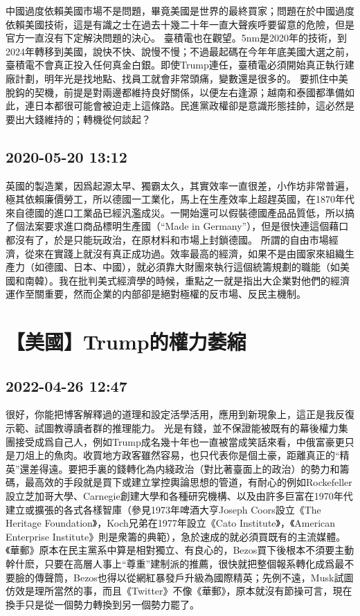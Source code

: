 \documentclass[twocolumn]{ctexart}
\begin{document}
中國過度依賴美國市場不是問題，畢竟美國是世界的最終買家；問題在於中國過度依賴美國技術，這是有識之士在過去十幾二十年一直大聲疾呼要留意的危險，但是官方一直沒有下定解決問題的決心。
臺積電也在觀望。5nm是2020年的技術，到2024年轉移到美國，說快不快、說慢不慢；不過最起碼在今年年底美國大選之前，臺積電不會真正投入任何真金白銀。即使Trump連任，臺積電必須開始真正執行建廠計劃，明年光是找地點、找員工就會非常頭痛，變數還是很多的。
要抓住中美脫鈎的契機，前提是對兩邊都維持良好關係，以便左右逢源；越南和泰國都準備如此，連日本都很可能會被迫走上這條路。民進黨政權卻是意識形態挂帥，這必然是要出大錢維持的；轉機從何談起？
\subsection*{2020-05-20 13:12}

英國的製造業，因爲起源太早、獨霸太久，其實效率一直很差，小作坊非常普遍，極其依賴廉價勞工，所以德國一工業化，馬上在生產效率上超趕英國，在1870年代來自德國的進口工業品已經汎濫成災。一開始還可以假裝德國產品品質低，所以搞了個法案要求進口商品標明生產國（“Made in Germany”），但是很快連這個藉口都沒有了，於是只能玩政治，在原材料和市場上封鎖德國。
所謂的自由市場經濟，從來在實踐上就沒有真正成功過。效率最高的經濟，如果不是由國家來組織生產力（如德國、日本、中國），就必須靠大財團來執行這個統籌規劃的職能（如美國和南韓）。我在批判美式經濟學的時候，重點之一就是指出大企業對他們的經濟運作至關重要，然而企業的内部卻是絕對極權的反市場、反民主機制。
\section*{【美國】Trump的權力萎縮}
\subsection*{2022-04-26 12:47}

很好，你能把博客解釋過的道理和設定活學活用，應用到新現象上，這正是我反復示範、試圖教導讀者群的推理能力。
光是有錢，並不保證能被既有的幕後權力集團接受成爲自己人，例如Trump成名幾十年也一直被當成笑話來看，中俄富豪更只是刀俎上的魚肉。收買地方政客雖然容易，也只代表你是個土豪，距離真正的“精英”還差得遠。要把手裏的錢轉化為内綫政治（對比著臺面上的政治）的勢力和籌碼，最高效的手段就是買下或建立掌控輿論思想的管道，有耐心的例如Rockefeller設立芝加哥大學、Carnegie創建大學和各種研究機構、以及由許多巨富在1970年代建立或擴張的各式各樣智庫（參見1973年啤酒大亨Joseph Coors設立《The Heritage Foundation》，Koch兄弟在1977年設立《Cato Institute》，《American Enterprise Institute》則是衆籌的典範），急於速成的就必須買既有的主流媒體。《華郵》原本在民主黨系中算是相對獨立、有良心的，Bezos買下後根本不須要主動幹什麽，只要在高層人事上“尊重”建制派的推薦，很快就把整個報系轉化成爲最不要臉的傳聲筒，Bezos也得以從網紅暴發戶升級為國際精英；先例不遠，Musk試圖仿效是理所當然的事，而且《Twitter》不像《華郵》，原本就沒有節操可言，現在換手只是從一個勢力轉換到另一個勢力罷了。
\end{document}
